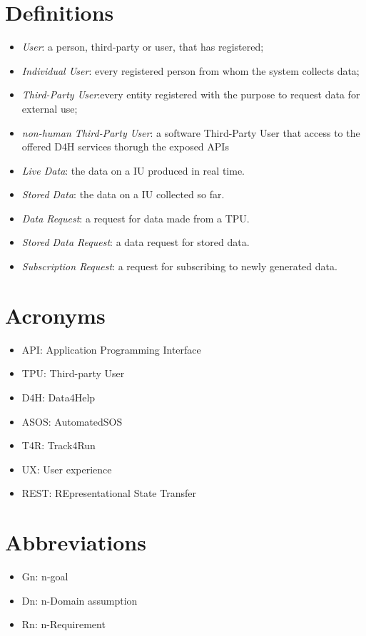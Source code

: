 \section{Definitions}
\begin{itemize}
\item \textit{User}: a person, third-party or user, that has registered;
\item \textit{Individual User}: every registered person from whom the system collects data; 
\item \textit{Third-Party User}:every entity registered with the purpose to request data for external use;
\item \textit{non-human Third-Party User}: a software Third-Party User that access to the offered D4H services thorugh the exposed APIs
\item \textit{Live Data}: the data on a IU produced in real time.
\item \textit{Stored Data}: the data on a IU collected so far.
\item \textit{Data Request}: a request for data made from a TPU.
\item \textit{Stored Data Request}: a data request for stored data.
\item \textit{Subscription Request}: a request for subscribing to newly generated data.
\end{itemize}
\section{Acronyms}
\begin{itemize}
\item API: Application Programming Interface
\item TPU: Third-party User
\item	D4H: Data4Help
\item	ASOS: AutomatedSOS
\item	T4R: Track4Run
\item UX: User experience
\item REST: REpresentational State Transfer
\end{itemize}

\section{Abbreviations}
\begin{itemize}
\item Gn: n-goal
\item Dn: n-Domain assumption
\item Rn: n-Requirement
\end{itemize}

